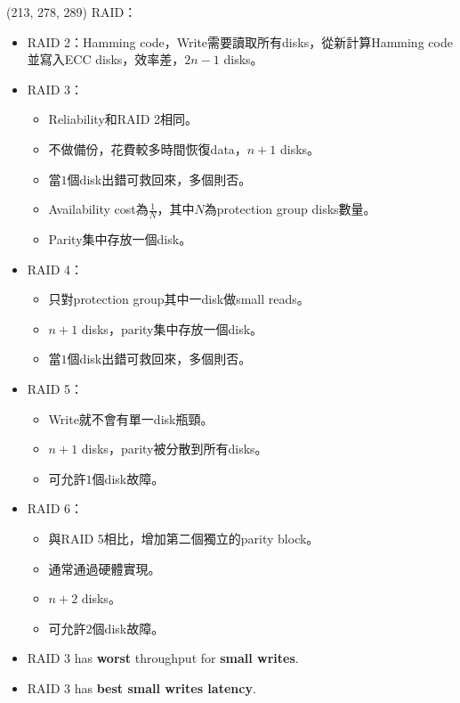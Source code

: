 \item \begin{theorem}{(213, 278, 289)} RAID：\begin{itemize}
        \item RAID 2：Hamming code，Write需要讀取所有disks，從新計算Hamming code並寫入ECC disks，效率差，$2n - 1$ disks。
        \item RAID 3：\begin{itemize}
            \item Reliability和RAID 2相同。
            \item 不做備份，花費較多時間恢復data，$n + 1$ disks。
            \item 當$1$個disk出錯可救回來，多個則否。
            \item Availability cost為$\frac{1}{N}$，其中$N$為protection group disks數量。
            \item Parity集中存放一個disk。
        \end{itemize}
        \item RAID 4：\begin{itemize}
            \item 只對protection group其中一disk做small reads。
            \item $n + 1$ disks，parity集中存放一個disk。
            \item 當$1$個disk出錯可救回來，多個則否。
        \end{itemize}
        \item RAID 5：\begin{itemize}
            \item Write就不會有單一disk瓶頸。
            \item $n + 1$ disks，parity被分散到所有disks。
            \item 可允許$1$個disk故障。
        \end{itemize}
        \item RAID 6：\begin{itemize}
            \item 與RAID 5相比，增加第二個獨立的parity block。
            \item 通常通過硬體實現。
            \item $n + 2$ disks。
            \item 可允許$2$個disk故障。
        \end{itemize}
        \item RAID 3 has \textbf{worst} throughput for \textbf{small writes}.
        \item RAID 3 has \textbf{best small writes latency}.

\end{itemize}
\end{theorem}
